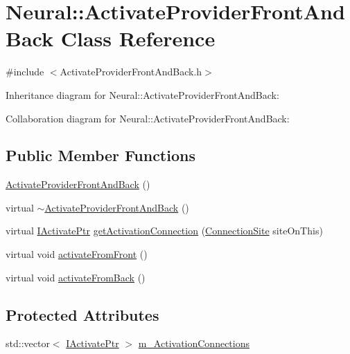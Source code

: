 \hypertarget{class_neural_1_1_activate_provider_front_and_back}{
\section{Neural::ActivateProviderFrontAndBack Class Reference}
\label{class_neural_1_1_activate_provider_front_and_back}
}


{\ttfamily \#include $<$ActivateProviderFrontAndBack.h$>$}



Inheritance diagram for Neural::ActivateProviderFrontAndBack:


Collaboration diagram for Neural::ActivateProviderFrontAndBack:
\subsection*{Public Member Functions}
\begin{DoxyCompactItemize}
\item 
\hyperlink{class_neural_1_1_activate_provider_front_and_back_a639139a9b47f5e90780d57aecfe7cf9b}{ActivateProviderFrontAndBack} ()
\item 
virtual \hyperlink{class_neural_1_1_activate_provider_front_and_back_aa318b74f734769f98fbb2c1f90046bf6}{$\sim$ActivateProviderFrontAndBack} ()
\item 
virtual \hyperlink{namespace_neural_aa317acf32f01510e99627087e14785c1}{IActivatePtr} \hyperlink{class_neural_1_1_activate_provider_front_and_back_aac88ad8c77a1795521078e16425d3c33}{getActivationConnection} (\hyperlink{namespace_neural_add871cb0324e8abfb693026afba3a621}{ConnectionSite} siteOnThis)
\item 
virtual void \hyperlink{class_neural_1_1_activate_provider_front_and_back_a5da39bdcc01ca52cc74fbc2ad6a07fe1}{activateFromFront} ()
\item 
virtual void \hyperlink{class_neural_1_1_activate_provider_front_and_back_a8c307cb61c6b95103d4ecfc6c569015e}{activateFromBack} ()
\end{DoxyCompactItemize}
\subsection*{Protected Attributes}
\begin{DoxyCompactItemize}
\item 
std::vector$<$ \hyperlink{namespace_neural_aa317acf32f01510e99627087e14785c1}{IActivatePtr} $>$ \hyperlink{class_neural_1_1_activate_provider_front_and_back_abaaf9f8b1b2711b9c48f5beb33f7cc85}{m\_\-ActivationConnections}
\end{DoxyCompactItemize}


